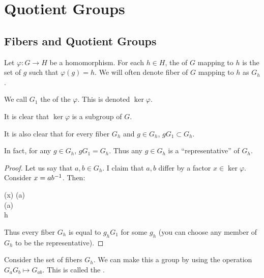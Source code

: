 \section{Quotient Groups}

\subsection{Fibers and Quotient Groups}

\begin{definition}
  Let $\varphi: G \to H$ be a homomorphism. For each $h\in H$, the
   of $G$ mapping to $h$ is the set of $g$ such that
  $\varphi(g) = h$. We will often denote fiber of $G$ mapping to $h$ as
  $G_h$.

  We call $G_1$ the  of the $\varphi$. This is denoted
  $\ker \varphi$.
\end{definition}

\begin{proposition}
  It is clear that $\ker \varphi$ is a subgroup of $G$.

  It is also clear that for every fiber $G_h$ and $g \in G_h$, $g G_1
  \subset G_h$.

  In fact, for any $g \in G_h$, $g G_1 = G_h$. Thus any $g \in G_h$ is a
  ``representative'' of $G_h$.
\end{proposition}

\begin{proof}
  Let us say that $a, b \in G_h$. I claim that $a, b$ differ by a
  factor $x \in \ker\varphi$. Consider $x = a {b}^{-1}$. Then:

  \begin{nedqn}
    \varphi(x)
  \eqcol
    \varphi(a) \varphi{}
  \\
  \eqcol
    \varphi(a) 
  \\
  \eqcol
    h 
  \\
  \end{nedqn}

  Thus every fiber $G_h$ is equal to $g_h G_1$ for some $g_h$ (you can
  choose any member of $G_h$ to be the representative).
\end{proof}

\begin{definition}
  Consider the set of fibers $G_h$. We can make this a group by using
  the operation $G_a G_b \mapsto G_{ab}$. This is called the
  .
\end{definition}

